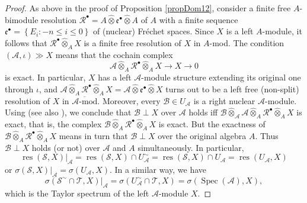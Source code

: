 \documentclass[12pt]{amsart}%
\theoremstyle{plain}
\numberwithin{equation}{section}
\numberwithin{equation}{section}
\numberwithin{theorem}{section}
\numberwithin{lemma}{section}
\numberwithin{remark}{section}
\numberwithin{example}{section}
\numberwithin{proposition}{section}
\numberwithin{definition}{section}
\numberwithin{corollary}{section}
\begin{document}
\begin{proof}
As above in the proof of Proposition \ref{propDom12}, consider a finite free
$A$-bimodule resolution $\mathcal{R}^{\bullet}=A\widehat{\otimes}%
\mathfrak{e}^{\bullet}\widehat{\otimes}A$ of $A$ with a finite sequence
$\mathfrak{e}^{\bullet}=\left\{  E_{i}:-n\leq i\leq0\right\}  $ of (nuclear)
Fr\'{e}chet spaces. Since $X$ is a left $A$-module, it follows that
$\mathcal{R}^{\bullet}\widehat{\otimes}_{A}X$ is a finite free resolution of
$X$ in $A$-mod. The condition $\left(  \mathcal{A},\iota\right)  \gg X$ means
that the cochain complex
\[
\mathcal{A}\widehat{\otimes}_{A}\mathcal{R}^{\bullet}\widehat{\otimes}%
_{A}X\rightarrow X\rightarrow0
\]
is exact. In particular, $X$ has a left $\mathcal{A}$-module structure
extending its original one through $\iota$, and $\mathcal{A}\widehat{\otimes
}_{A}\mathcal{R}^{\bullet}\widehat{\otimes}_{A}X=\mathcal{A}\widehat{\otimes
}\mathfrak{e}^{\bullet}\widehat{\otimes}X$ turns out to be a left free
(non-split) resolution of $X$ in $\overline{\mathcal{A}\text{-mod}}$.
Moreover, every $\mathcal{B}\in U_{\mathcal{A}}$ is a right nuclear
$\mathcal{A}$-module. Using \cite[Corollary 3.1.13]{EP} (see also
\cite[Proposition 2.6]{Tay2}), we conclude that $\mathcal{B}\perp X$ over
$\mathcal{A}$ holds iff $\mathcal{B}\widehat{\otimes}_{\mathcal{A}}%
\mathcal{A}\widehat{\otimes}_{A}\mathcal{R}^{\bullet}\widehat{\otimes}_{A}X$
is exact, that is, the complex $\mathcal{B}\widehat{\otimes}_{A}%
\mathcal{R}^{\bullet}\widehat{\otimes}_{A}X$ is exact. But the exactness of
$\mathcal{B}\widehat{\otimes}_{A}\mathcal{R}^{\bullet}\widehat{\otimes}_{A}X$
means in turn that $\mathcal{B}\perp X$ over the original algebra $A$. Thus
$\mathcal{B}\perp X$ holds (or not) over $\mathcal{A}$ and $A$ simultaneously.
In particular,%
\[
\operatorname{res}\left(  \mathcal{S},X\right)  |_{\mathcal{A}}%
=\operatorname{res}\left(  \mathcal{S},X\right)  \cap U_{\mathcal{A}}^{\sim
}=\operatorname{res}\left(  \mathcal{S},X\right)  \cap U_{\mathcal{A}%
}=\operatorname{res}\left(  U_{\mathcal{A}},X\right)
\]
or $\sigma\left(  \mathcal{S},X\right)  |_{\mathcal{A}}=\sigma\left(
U_{\mathcal{A}},X\right)  $. In a similar way, we have
\[
\sigma\left(  \mathcal{S}^{\sim}\cap\mathcal{T},X\right)  |_{\mathcal{A}%
}=\sigma\left(  U_{\mathcal{A}}^{\sim}\cap\mathcal{T},X\right)  =\sigma\left(
\operatorname{Spec}\left(  \mathcal{A}\right)  ,X\right)  ,
\]
which is the Taylor spectrum of the left $\mathcal{A}$-module $X$.


\end{proof}
\end{document}
